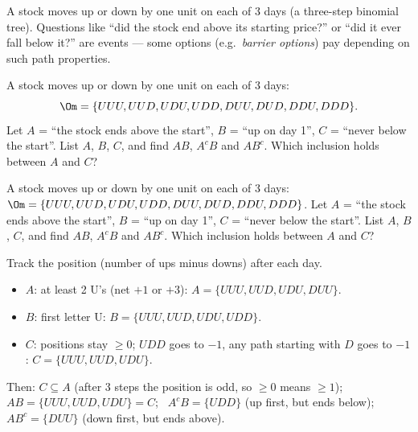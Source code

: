 
\begin{problem}
	\begin{context}
		A stock moves up or down by one unit on each of 3 days (a three-step
		binomial tree). Questions like ``did the stock end above its starting price?'' or
		``did it ever fall below it?'' are events --- some options (e.g.\
		\emph{barrier options}) pay depending on such path properties.
	\end{context}
	A stock moves up or down by one unit on each of 3 days:
	\[ \Om=\{UUU,UUD,UDU,UDD,DUU,DUD,DDU,DDD\}. \]
	Let $A$ = ``the stock ends above the start'', $B$ = ``up on day 1'', $C$ = ``never below the start''. List
	$A$, $B$, $C$, and find $AB$, $A^cB$ and $AB^c$. Which inclusion holds
	between $A$ and $C$?
\end{problem}

\begin{slideproblem}
	A stock moves up or down by one unit on each of 3 days:\newline
	$\Om=\{UUU,UUD,UDU,UDD,DUU,DUD,DDU,DDD\}$. Let $A$ = ``the stock ends above
	the start'', $B$ = ``up on day 1'', $C$ = ``never below the start''. List
	$A$, $B$, $C$, and find $AB$, $A^cB$ and $AB^c$. Which inclusion holds
	between $A$ and $C$?
\end{slideproblem}

\begin{slides}
	\small
	\exstatement
	\pause
	\sol Track the position (number of ups minus downs) after each day.
	\begin{itemize}
		\item $A$: at least 2 U's (net $+1$ or $+3$): $A=\{UUU,UUD,UDU,DUU\}$.
		\item $B$: first letter U: $B=\{UUU,UUD,UDU,UDD\}$.
		\item $C$: positions stay $\ge 0$; $UDD$ goes to $-1$, any path starting
		      with $D$ goes to $-1$: $C=\{UUU,UUD,UDU\}$.
	\end{itemize}
	Then: $C\subseteq A$ (after 3 steps the position is odd, so $\ge0$ means
	$\ge1$); \ $AB=\{UUU,UUD,UDU\}=C$; \ $A^cB=\{UDD\}$ (up first, but ends
	below); \ $AB^c=\{DUU\}$ (down first, but ends above).
\end{slides}

